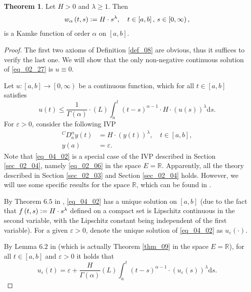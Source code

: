 \documentclass[reqno]{amsart}
\numberwithin{equation}{section}
\theoremstyle{definition}
\newtheorem{theorem}{Theorem}
\theoremstyle{remark}
\newcommand{\br}[1]{\left(#1\right)}
\newcommand{\DC}[3]{{}^{C}\!D^{#1}_{#2}{#3}}
\newcommand{\definitionRef}[1]{\textrm{Definition \ref{#1}}}
\newcommand{\defeq}{\vcentcolon=}
\newcommand{\ds}{\mathrm{d}s}
\newcommand{\eps}{\varepsilon}
\newcommand{\Lint}[3]{\br{L}\!\displaystyle\int_{#1}^{#2}{#3}}
\newcommand{\lsrbr}[1]{\left[#1\right)}
\newcommand{\R}{\mathbb{R}}
\newcommand{\sbr}[1]{\left[#1\right]}
\newcommand{\sectionRef}[1]{\textrm{Section \ref{#1}}}
\newcommand{\st}{\!:}
\newcommand{\theoremRef}[1]{\textrm{Theorem \ref{#1}}}
\begin{document}
	\begin{theorem}\label{thm_16}
		Let $H>0$ and $\lambda\geq1$. Then
		\begin{equation*}
			w_{\alpha}\br{t,s}\defeq{H}\cdot{s}^{\lambda},\quad{t}\in\sbr{a,b},\,s\in\lsrbr{0,\infty},
		\end{equation*}
		is a Kamke function of order $\alpha$ on $\sbr{a,b}$.
	\end{theorem}
	\begin{proof}
	The first two axioms of \definitionRef{def_08} are obvious, thus it suffices to verify the last one. We will show that the only non-negative continuous solution of \eqref{eq_02_27} is $u\equiv0$.
	
	Let $u\st\sbr{a,b}\rightarrow\lsrbr{0,\infty}$ be a continuous function, which for all $t\in\sbr{a,b}$ satisfies
	\begin{equation}\label{eq_04_01}
		u\br{t}\leq\frac{1}{\Gamma\br{\alpha}}\cdot\Lint{a}{t}{\br{t-s}^{\alpha-1}\cdot{H}\cdot\br{u\br{s}}^{\lambda}\ds}.
	\end{equation}
	For $\eps>0$, consider the following IVP
	\begin{subequations}\label{eq_04_02}
		\begin{align}
			\DC{\alpha}{a}{y}\br{t}&=H\cdot\br{y\br{t}}^{\lambda},\quad{t}\in\sbr{a,b},\label{eq_04_02_01}\\
			y\br{a}&=\eps.
		\end{align}
	\end{subequations}
	Note that \eqref{eq_04_02} is a special case of the IVP described in \sectionRef{sec_02_04}, namely \eqref{eq_02_06} in the space $E=\R$. Apparently, all the theory described in \sectionRef{sec_02_03} and \sectionRef{sec_02_04} holds. However, we will use some specific results for the space $\R$, which can be found in \cite{Diethelm}.
	
	By Theorem $6.5$ in \cite{Diethelm}, \eqref{eq_04_02} has a unique solution on $\sbr{a,b}$ (due to the fact that $f\br{t,s}\defeq{H}\cdot{s}^{\lambda}$ defined on a compact set is Lipschitz continuous in the second variable, with the Lipschitz constant being independent of the first variable). For a given $\eps>0$, denote the unique solution of \eqref{eq_04_02} as $u_{\eps}\br{\cdot}$.
	
	By Lemma $6.2$ in \cite{Diethelm} (which is actually \theoremRef{thm_09} in the space $E=\R$), for all $t\in\sbr{a,b}$ and $\eps>0$ it holds that
	\begin{equation}\label{eq_04_03}
		u_{\eps}\br{t}=\eps+\frac{H}{\Gamma\br{\alpha}}\Lint{a}{t}{\br{t-s}^{\alpha-1}\cdot\br{u_{\eps}\br{s}}^{\lambda}\ds}.
	\end{equation}
	

\end{proof}
\end{document}
